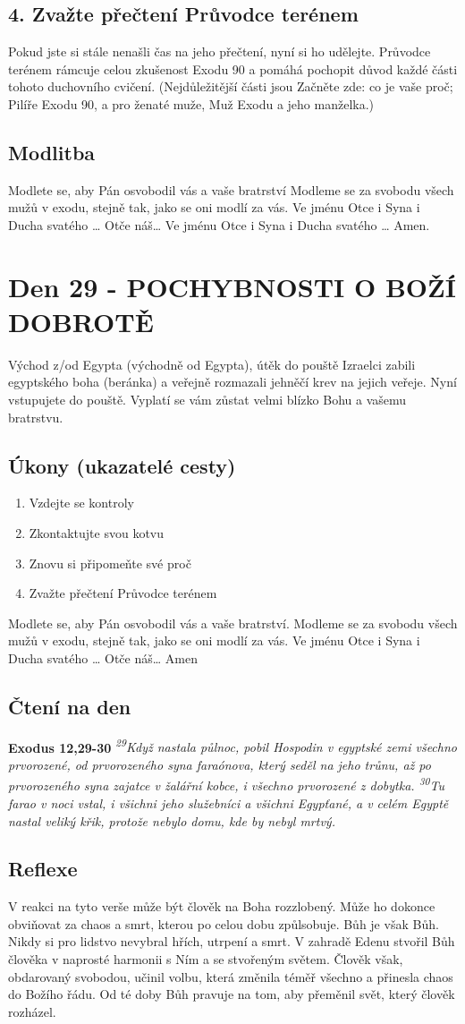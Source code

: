 \documentclass[11pt]{article}
\newcommand{\zacatekPatyTyden}{
  Východ z/od Egypta (východně od Egypta), útěk do pouště \newline
  Izraelci zabili egyptského boha (beránka) a veřejně rozmazali jehněčí krev na jejich veřeje. Nyní vstupujete
  do pouště. Vyplatí se vám zůstat velmi blízko Bohu a vašemu bratrstvu.

\subsection*{Úkony (ukazatelé cesty)}
\begin{enumerate}
  \item Vzdejte se kontroly
  \item Zkontaktujte svou kotvu
  \item Znovu si připomeňte své proč
  \item Zvažte přečtení Průvodce terénem
\end{enumerate}
Modlete se, aby Pán osvobodil vás a vaše bratrství. \newline
Modleme se za svobodu všech mužů v exodu, stejně tak, jako se oni modlí za vás.\newline
Ve jménu Otce i Syna i Ducha svatého …  Otče náš… Amen
}
\begin{document}
\subsection*{4. Zvažte přečtení Průvodce terénem}
Pokud jste si stále nenašli čas na jeho přečtení, nyní si ho udělejte. Průvodce terénem rámcuje celou zkušenost Exodu 90 a pomáhá pochopit důvod každé části tohoto duchovního cvičení. (Nejdůležitější části jsou Začněte zde: co je vaše proč; Pilíře Exodu 90, a pro ženaté muže, Muž Exodu a jeho manželka.)

\subsection*{Modlitba}
Modlete se, aby Pán osvobodil vás a vaše bratrství \newline
Modleme se za svobodu všech mužů v exodu, stejně tak, jako se oni modlí za vás.\newline
Ve jménu Otce i Syna i Ducha svatého … Otče náš… Ve jménu Otce i Syna i Ducha svatého … Amen.
\newpage

\newpage
\section{Den 29 - POCHYBNOSTI O BOŽÍ DOBROTĚ}
\zacatekPatyTyden
\subsection*{Čtení na den}
\textbf{Exodus 12,29-30}
\newline
\textit{
\textsuperscript{29}Když nastala půlnoc, pobil Hospodin v egyptské zemi všechno prvorozené, od prvorozeného syna faraónova, který seděl na jeho trůnu, až po prvorozeného syna zajatce v žalářní kobce, i všechno prvorozené z dobytka.
\textsuperscript{30}Tu farao v noci vstal, i všichni jeho služebníci a všichni Egypťané, a v celém Egyptě nastal veliký křik, protože nebylo domu, kde by nebyl mrtvý.
}

\subsection*{Reflexe}

V reakci na tyto verše může být člověk na Boha rozzlobený. Může ho dokonce obviňovat za chaos a smrt,
kterou po celou dobu způlsobuje. Bůh je však Bůh. Nikdy si pro lidstvo nevybral hřích, utrpení a smrt.
V zahradě Edenu stvořil Bůh člověka v naprosté harmonii s Ním a se stvořeným světem. Člověk však,
obdarovaný svobodou, učinil volbu, která změnila téměř všechno a přinesla chaos do Božího řádu. Od té
doby Bůh pravuje na tom, aby přeměnil svět, který člověk rozházel.
\end{document}
